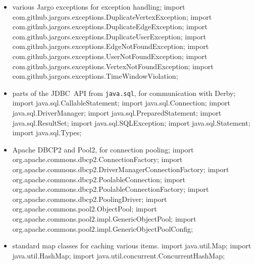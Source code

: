 \begin{itemize}
\item various Jargo exceptions for exception handling;
\nwenddocs{}\plusendmoddef
import com.github.jargors.exceptions.DuplicateVertexException;
import com.github.jargors.exceptions.DuplicateEdgeException;
import com.github.jargors.exceptions.DuplicateUserException;
import com.github.jargors.exceptions.EdgeNotFoundException;
import com.github.jargors.exceptions.UserNotFoundException;
import com.github.jargors.exceptions.VertexNotFoundException;
import com.github.jargors.exceptions.TimeWindowViolation;
\nwendcode{}\item parts of the JDBC~API from {\tt{}java.sql}, for communication with Derby;
\nwenddocs{}\plusendmoddef
import java.sql.CallableStatement;   import java.sql.Connection;
import java.sql.DriverManager;       import java.sql.PreparedStatement;
import java.sql.ResultSet;           import java.sql.SQLException;
import java.sql.Statement;           import java.sql.Types;
\nwendcode{}\item Apache DBCP2 and Pool2, for connection pooling;
\nwenddocs{}\plusendmoddef
import org.apache.commons.dbcp2.ConnectionFactory;
import org.apache.commons.dbcp2.DriverManagerConnectionFactory;
import org.apache.commons.dbcp2.PoolableConnection;
import org.apache.commons.dbcp2.PoolableConnectionFactory;
import org.apache.commons.dbcp2.PoolingDriver;
import org.apache.commons.pool2.ObjectPool;
import org.apache.commons.pool2.impl.GenericObjectPool;
import org.apache.commons.pool2.impl.GenericObjectPoolConfig;
\nwendcode{}\item standard map classes for caching various items.
\nwenddocs{}\plusendmoddef
import java.util.Map;
import java.util.HashMap;
import java.util.concurrent.ConcurrentHashMap;
\nwendcode{}\nwdocspar
\end{itemize}

